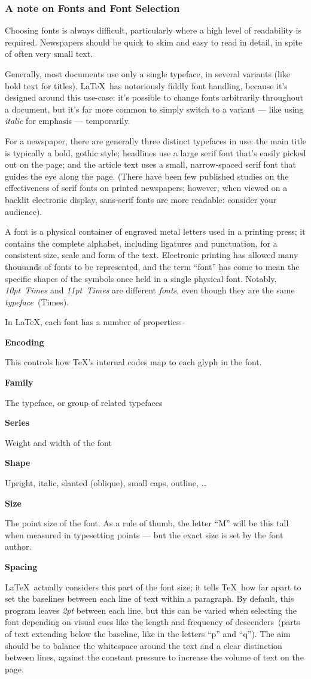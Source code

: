 \documentclass[a4paper,DIV=11]{scrartcl}
\newcommand{\deft}[2]{\nopagebreak\noindent\hspace{0.5in}\textbf{#1}\par\noindent{}#2\pagebreak[1]\par}
\begin{document}
\subsubsection*{A note on Fonts and Font Selection}

Choosing fonts is always difficult, particularly where a high level of
readability is required. Newspapers should be quick to skim and easy
to read in detail, in spite of often very small text.

Generally, most documents use only a single typeface, in several
variants (like bold text for titles). \LaTeX\ has notoriously fiddly
font handling, because it's designed around this use-case: it's
possible to change fonts arbitrarily throughout a document, but it's
far more common to simply switch to a variant --- like using
\textit{italic} for emphasis --- temporarily.

For a newspaper, there are generally three distinct typefaces in use:
the main title is typically a bold, gothic style; headlines use a
large serif font that's easily picked out on the page; and the article
text uses a small, narrow-spaced serif font that guides the eye along
the page. (There have been few published studies on the effectiveness
of serif fonts on printed newspapers; however, when viewed on a
backlit electronic display, sans-serif fonts are more readable:
consider your audience).

A font is a physical container of engraved metal letters used in a
printing press; it contains the complete alphabet, including ligatures
and punctuation, for a consistent size, scale and form of the text. Electronic
printing has allowed many thousands of fonts to be represented, and
the term ``font'' has come to mean the specific shapes of the symbols
once held in a single physical font. Notably, \textit{10pt~Times} and
\textit{11pt~Times} are different \textit{fonts}, even though they are
the same \textit{typeface}~(Times).

In \LaTeX, each font has a number of properties:-\par
\deft{Encoding}{This controls how \TeX's internal codes map to each glyph in the font.}
\deft{Family}{The typeface, or group of related typefaces}
\deft{Series}{Weight and width of the font}
\deft{Shape}{Upright, italic, slanted (oblique), small caps, outline, \dots}
\deft{Size}{The point size of the font. As a rule of thumb, the letter
  ``M'' will be this tall when measured in typesetting points --- but
  the exact size is set by the font author.}
\deft{Spacing}{\LaTeX\ actually considers this part of the font size;
  it tells \TeX\ how far apart to set the baselines between each line
  of text within a paragraph. By default, this program leaves \textit{2pt}
  between each line, but this can be varied when selecting the font
  depending on visual cues like the length and frequency of
  descenders~(parts of text extending below the baseline, like in the
  letters ``p'' and ``q''). The aim should be to balance the
  whitespace around the text and a clear distinction between lines,
  against the constant pressure to increase the volume of text on the
  page.}
\end{document}
